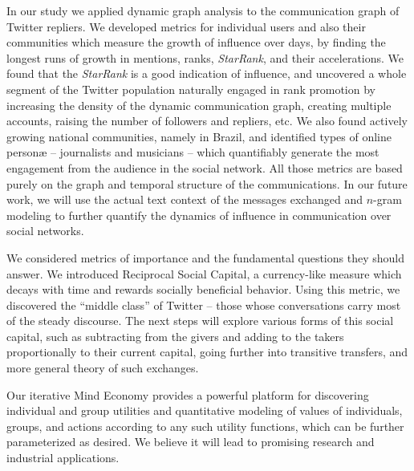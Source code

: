 \documentclass[10pt,oneside]{memoir}
\def\mybibliostyle{plain}
\def\bibliocommand{}
\begin{document}
In our study we applied dynamic graph analysis to the communication graph of Twitter repliers.  We developed metrics for individual users and also their communities which measure the growth of influence over days, by finding the longest runs of growth in mentions, ranks, \emph{StarRank}, and their accelerations.  We found that the \emph{StarRank} is a good indication of influence, and uncovered a whole segment of the Twitter population naturally engaged in rank promotion by increasing the density of the dynamic communication graph, creating multiple accounts, raising the number of followers and repliers, etc.  We also found actively growing national communities, namely in Brazil, and identified types of online personæ -- journalists and musicians -- which quantifiably generate the most engagement from the audience in the social network.  All those metrics are based purely on the graph and temporal structure of the communications.  In our future work, we will use the actual text context of the messages exchanged and $n$-gram modeling to further quantify the dynamics of influence in communication over social networks.


We considered metrics of importance and the fundamental questions they should answer. We introduced Reciprocal Social Capital, a currency-like measure which decays with time and rewards socially beneficial behavior. Using this metric, we discovered the ``middle class'' of Twitter -- those whose conversations carry most of the steady discourse. The next steps will explore various forms of this social capital, such as subtracting from the givers and adding to the takers proportionally to their current capital, going further into transitive transfers, and more general theory of such exchanges.  


Our iterative Mind Economy provides a powerful platform for discovering individual and group utilities and quantitative modeling of values of individuals, groups, and actions according to any such utility functions, which can be further parameterized as desired.  We believe it will lead to promising research and industrial applications.




\pagebreak \appendixpage*
\appendix

%
%

\backmatter


\bibliocommand

\printglossary


\printindex
\end{document}

